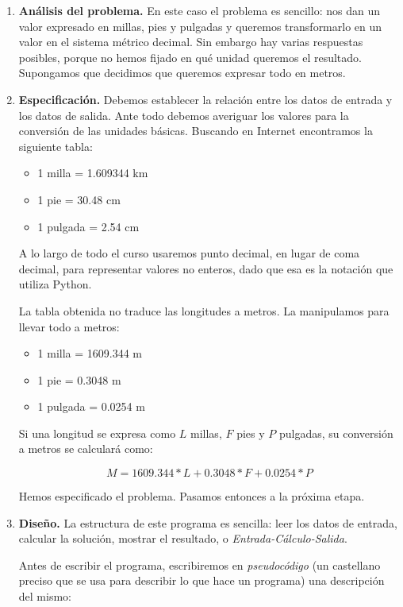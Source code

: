 \begin{enumerate}
\item {\bf Análisis del problema.} En este caso el problema es
sencillo: nos dan un valor expresado en millas, pies y pulgadas y
queremos transformarlo en un valor en el sistema métrico decimal.
Sin embargo hay varias respuestas posibles, porque no hemos fijado
en qué unidad queremos el resultado. Supongamos que decidimos que
queremos expresar todo en metros.

\item {\bf Especificación.} Debemos establecer la relación entre
los datos de entrada y los datos de salida. Ante todo debemos
averiguar los valores para la conversión de las unidades básicas.
Buscando en Internet encontramos la siguiente tabla:

\begin{itemize}
\item 1 milla = 1.609344 km
\item 1 pie = 30.48 cm
\item 1 pulgada = 2.54 cm
\end{itemize}

\begin{atencion}
A lo largo de todo el curso usaremos punto decimal,
en lugar de coma decimal, para representar valores no enteros,
dado que esa es la notación que utiliza Python.
\end{atencion}

La tabla obtenida no traduce las longitudes a metros. La manipulamos para
llevar todo a metros:

\begin{itemize}
\item 1 milla = 1609.344 m
\item 1 pie = 0.3048 m
\item 1 pulgada = 0.0254 m
\end{itemize}

Si una longitud se expresa como $L$ millas, $F$ pies y $P$ pulgadas, su
conversión a metros se calculará como:

$$
M = 1609.344 * L + 0.3048 * F + 0.0254 * P
$$

Hemos especificado el problema. Pasamos entonces a la próxima etapa.

\item {\bf Diseño.} La estructura de este programa es sencilla:
leer los datos de entrada, calcular la solución, mostrar el
resultado, o \emph{Entrada-Cálculo-Salida}.

Antes de escribir el programa, escribiremos en \emph{pseudocódigo}
(un castellano preciso que se usa para describir lo que hace un
programa) una descripción del mismo:


\end{enumerate}

